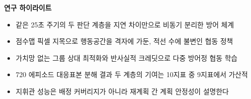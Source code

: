 
\vspace{4pt}
\begin{center}
\begin{minipage}{0.96\textwidth}
\small
\noindent\textbf{연구 하이라이트}
\begin{itemize}[leftmargin=1.2em, itemsep=1pt, topsep=2pt, parsep=0pt]
\item 같은 25초 주기의 두 판단 계층을 지연 차이만으로 비동기 분리한 방어 체계
\item 점수맵 픽셀 지목으로 행동공간을 격자에 가둔, 적선 수에 불변인 협동 정책
\item 가치망 없는 그룹 상대 최적화와 반사실적 크레딧으로 다중 방어정 협동 학습
\item 720 에피소드 대응표본 분해 결과 두 계층의 기여는 10지표 중 9지표에서 가산적
\item 지휘관 성능은 배정 커버리지가 아니라 재계획 간 계획 안정성이 설명한다
\end{itemize}
\end{minipage}
\end{center}
